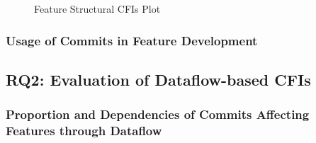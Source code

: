 \clearpage

\begin{figure}[htbp]
  \centering
  
  \caption{Feature Structural CFIs Plot}
  \label{fig:feature_sfbr_plot}
\end{figure}

\subsubsection*{Usage of Commits in Feature Development}\label{sec:eval_commit_usage}

\subsection*{\textbf{RQ2: Evaluation of Dataflow-based CFIs}}\label{sec:eval_df_cfis}

\subsubsection*{Proportion and Dependencies of Commits Affecting Features through Dataflow}\label{sec:eval_commit_dfbr}

